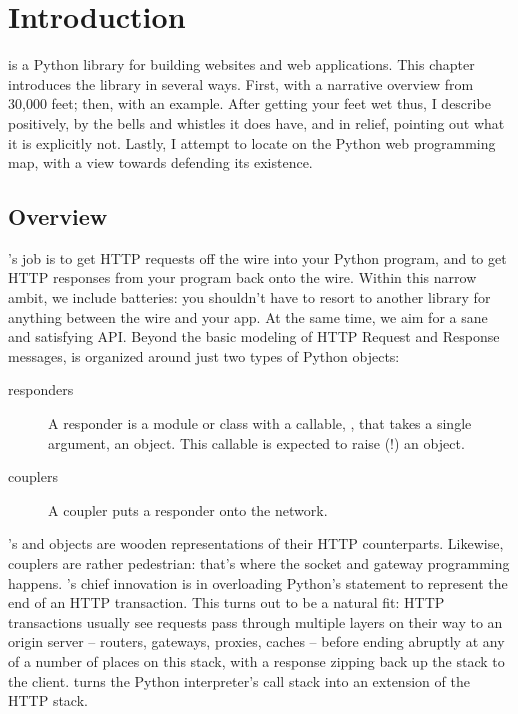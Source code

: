 \chapter{Introduction \label{introduction}}

 is a Python library for building websites and web applications.
This chapter introduces the library in several ways. First, with a narrative
overview from 30,000 feet; then, with an example. After getting your feet wet
thus, I describe  positively, by the bells and whistles it does
have, and in relief, pointing out what it is explicitly not. Lastly, I attempt
to locate  on the Python web programming map, with a view towards
defending its existence.


\section{Overview \label{overview}}

's job is to get HTTP requests off the wire into your Python
program, and to get HTTP responses from your program back onto the wire. Within
this narrow ambit, we include batteries: you shouldn't have to resort to another
library for anything between the wire and your app. At the same time, we aim for
a sane and satisfying API. Beyond the basic modeling of HTTP Request and
Response messages,  is organized around just two types of Python
objects:

\begin{description}

\item[responders]
    {A responder is a module or class with a callable, , that
    takes a single argument, an  object. This callable is
    expected to raise (!) an  object.}

\item[couplers]
    {A coupler puts a responder onto the network.}

\end{description}

's  and  objects are wooden
representations of their HTTP counterparts. Likewise, couplers are rather
pedestrian: that's where the socket and gateway programming happens.
's chief innovation is in overloading Python's 
statement to represent the end of an HTTP transaction. This turns out to be a
natural fit: HTTP transactions usually see requests pass through multiple layers
on their way to an origin server -- routers, gateways, proxies, caches -- before
ending abruptly at any of a number of places on this stack, with a response
zipping back up the stack to the client.  turns the Python
interpreter's call stack into an extension of the HTTP stack.



